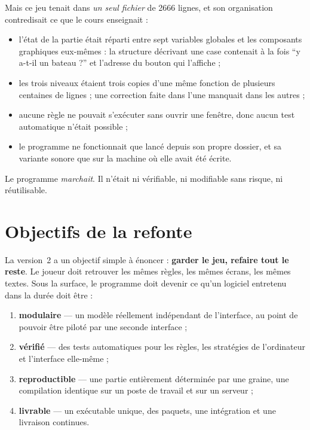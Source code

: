 Mais ce jeu tenait dans \emph{un seul fichier} de \num{2666} lignes, et son organisation
contredisait ce que le cours enseignait :

\begin{itemize}
    \item l'état de la partie était réparti entre sept variables globales et les composants
          graphiques eux-mêmes : la structure décrivant une case contenait à la fois
          \enquote{y a-t-il un bateau ?} et l'adresse du bouton qui l'affiche ;
    \item les trois niveaux étaient trois copies d'une même fonction de plusieurs centaines de
          lignes ; une correction faite dans l'une manquait dans les autres ;
    \item aucune règle ne pouvait s'exécuter sans ouvrir une fenêtre, donc aucun test
          automatique n'était possible ;
    \item le programme ne fonctionnait que lancé depuis son propre dossier, et sa variante
          sonore que sur la machine où elle avait été écrite.
\end{itemize}

Le programme \emph{marchait}. Il n'était ni vérifiable, ni modifiable sans risque, ni
réutilisable.

\section{Objectifs de la refonte}

La version~2 a un objectif simple à énoncer : \textbf{garder le jeu, refaire tout le reste}.
Le joueur doit retrouver les mêmes règles, les mêmes écrans, les mêmes textes. Sous la
surface, le programme doit devenir ce qu'un logiciel entretenu dans la durée doit être :

\begin{enumerate}
    \item \textbf{modulaire} --- un modèle réellement indépendant de l'interface, au point de
          pouvoir être piloté par une seconde interface ;
    \item \textbf{vérifié} --- des tests automatiques pour les règles, les stratégies de
          l'ordinateur et l'interface elle-même ;
    \item \textbf{reproductible} --- une partie entièrement déterminée par une graine, une
          compilation identique sur un poste de travail et sur un serveur ;
    \item \textbf{livrable} --- un exécutable unique, des paquets, une intégration et une
          livraison continues.
\end{enumerate}

